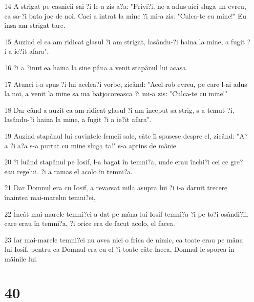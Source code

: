 \par 14 A strigat pe casnicii sai ?i le-a zis a?a: "Privi?i, ne-a adus aici sluga un evreu, ca sa-?i bata joc de noi. Caci a intrat la mine ?i mi-a zis: "Culca-te cu mine!" Eu însa am strigat tare.
\par 15 Auzind el ca am ridicat glasul ?i am strigat, lasându-?i haina la mine, a fugit ?i a ie?it afara".
\par 16 ?i a ?inut ea haina la sine pâna a venit stapânul lui acasa.
\par 17 Atunci i-a spus ?i lui acelea?i vorbe, zicând: "Acel rob evreu, pe care l-ai adus la noi, a venit la mine sa ma batjocoreasca ?i mi-a zis: "Culca-te cu mine!"
\par 18 Dar când a auzit ca am ridicat glasul ?i am început sa strig, s-a temut ?i, lasându-?i haina la mine, a fugit ?i a ie?it afara".
\par 19 Auzind stapânul lui cuvintele femeii sale, câte îi spusese despre el, zicând: "A?a ?i a?a s-a purtat cu mine sluga ta!" s-a aprins de mânie
\par 20 ?i luând stapânul pe Iosif, l-a bagat în temni?a, unde erau închi?i cei ce gre?eau regelui. ?i a ramas el acolo în temni?a.
\par 21 Dar Domnul era cu Iosif, a revarsat mila asupra lui ?i i-a daruit trecere înaintea mai-marelui temni?ei,
\par 22 Încât mai-marele temni?ei a dat pe mâna lui Iosif temni?a ?i pe to?i osândi?ii, care erau în temni?a, ?i orice era de facut acolo, el facea.
\par 23 Iar mai-marele temni?ei nu avea nici o frica de nimic, ca toate erau pe mâna lui Iosif, pentru ca Domnul era cu el ?i toate câte facea, Domnul le sporea în mâinile lui.

\chapter{40}

